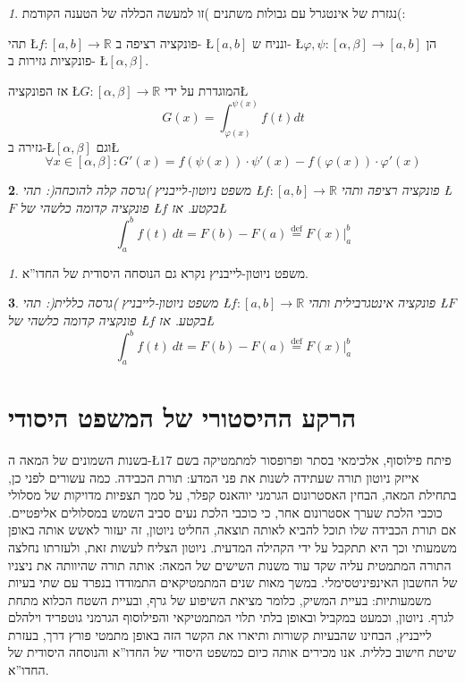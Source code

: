 \documentclass[english,hebrew]{article}
\theoremstyle{remark}
\newtheorem*{rem*}{\protect\remarkname}
\theoremstyle{definition}
\theoremstyle{plain}
\newtheorem{thm}{\protect\theoremname}
\theoremstyle{remark}
\newtheorem{claim}[thm]{\protect\claimname}
\theoremstyle{plain}
\theoremstyle{plain}
\theoremstyle{definition}
\theoremstyle{plain}
\providecommand{\claimname}{טענה}
\providecommand{\remarkname}{הערה}
\providecommand{\theoremname}{משפט}
\begin{document}
\begin{claim}
נגזרת של אינטגרל עם גבולות משתנים )זו למעשה הכללה של הטענה הקודמת(:

תהי \L{$f:\left[a,b\right]\rightarrow\mathbb{R}$} פונקציה רציפה ב-
\L{$\left[a,b\right]$} ונניח ש- \L{$\varphi,\psi:\left[\alpha,\beta\right]\rightarrow\left[a,b\right]$}
הן פונקציות גזירות ב- \L{$\left[\alpha,\beta\right]$}.

אז הפונקציה \L{$G:\left[\alpha,\beta\right]\rightarrow\mathbb{R}$}
המוגדרת על ידי\L{%
\[
G(x)=\int_{\varphi\left(x\right)}^{\psi\left(x\right)}f(t)dt
\]
}%
גזירה ב-\L{$\left[\alpha,\beta\right]$} וגם\L{%
\[
\forall x\in\left[\alpha,\beta\right]:G'(x)=f\left(\psi\left(x\right)\right)\cdot\psi'\left(x\right)-f\left(\varphi\left(x\right)\right)\cdot\varphi'\left(x\right)
\]
}%
\end{claim}

\begin{thm}
משפט ניוטון-לייבניץ )גרסה קלה להוכחה(: תהי \L{$f:\left[a,b\right]\rightarrow\mathbb{R}$}
פונקציה רציפה ותהי \L{$F$} פונקציה קדומה כלשהי של \L{$f$} בקטע.
אז\L{%
\[
\int_{a}^{b}f(t)\ dt=F\left(b\right)-F\left(a\right)\overset{\text{def}}{=}F\left(x\right)|_{a}^{b}
\]
}%
\end{thm}

\begin{rem*}
משפט ניוטון-לייבניץ נקרא גם הנוסחה היסודית של החדו\textquotedblright א.
\end{rem*}
\begin{thm}
משפט ניוטון-לייבניץ )גרסה כללית(: תהי \L{$f:\left[a,b\right]\rightarrow\mathbb{R}$}
פונקציה אינטגרבילית ותהי \L{$F$} פונקציה קדומה כלשהי של \L{$f$}
בקטע. אז\L{%
\[
\int_{a}^{b}f(t)\ dt=F\left(b\right)-F\left(a\right)\overset{\text{def}}{=}F\left(x\right)|_{a}^{b}
\]
}%
\end{thm}

\part{הרקע ההיסטורי של המשפט היסודי}

בשנות השמונים של המאה ה-\L{$17$} פיתח פילוסוף, אלכימאי בסתר ופרופסור
למתמטיקה בשם אייזק ניוטון תורה שעתידה לשנות את פני המדע: תורת הכבידה.
כמה עשורים לפני כן, בתחילת המאה, הבחין האסטרונום הגרמני יוהאנס קפלר,
על סמך תצפיות מדויקות של מסלולי כוכבי הלכת שערך אסטרונום אחר, כי כוכבי
הלכת נעים סביב השמש במסלולים אליפטיים. אם תורת הכבידה שלו תוכל להביא
לאותה תוצאה, החליט ניוטון, זה יעזור לאשש אותה באופן משמעותי וכך היא
תתקבל על ידי הקהילה המדעית. ניוטון הצליח לעשות זאת, ולעזרתו נחלצה
התורה המתמטית עליה שקד עוד משנות השישים של המאה: אותה תורה שהיוותה
את ניצניו של החשבון האינפיניטסימלי. במשך מאות שנים המתמטיקאים התמודדו
בנפרד עם שתי בעיות משמעותיות: בעיית המשיק, כלומר מציאת השיפוע של גרף,
ובעיית השטח הכלוא מתחת לגרף. ניוטון, וכמעט במקביל ובאופן בלתי תלוי
המתמטיקאי והפילוסוף הגרמני גוטפריד וילהלם לייבניץ, הבחינו שהבעיות
קשורות ותיארו את הקשר הזה באופן מתמטי פורץ דרך, בעזרת שיטת חישוב כללית.
אנו מכירים אותה כיום כמשפט היסודי של החדו\textquotedblright א והנוסחה
היסודית של החדו\textquotedblright א.
\end{document}
